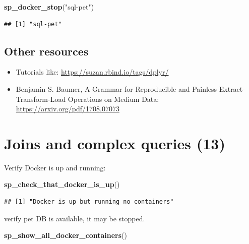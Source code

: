 \documentclass[]{book}
\newenvironment{Shaded}{\begin{snugshade}}{\end{snugshade}}
\newcommand{\KeywordTok}[1]{\textcolor[rgb]{0.13,0.29,0.53}{\textbf{#1}}}
\newcommand{\NormalTok}[1]{#1}
\newcommand{\StringTok}[1]{\textcolor[rgb]{0.31,0.60,0.02}{#1}}
\providecommand{\tightlist}{%
  \setlength{\itemsep}{0pt}\setlength{\parskip}{0pt}}
\theoremstyle{definition}
\theoremstyle{definition}
\theoremstyle{definition}
\theoremstyle{remark}
\begin{document}
\begin{Shaded}
\begin{Highlighting}[]
\KeywordTok{sp_docker_stop}\NormalTok{(}\StringTok{"sql-pet"}\NormalTok{)}
\end{Highlighting}
\end{Shaded}

\begin{verbatim}
## [1] "sql-pet"
\end{verbatim}

\hypertarget{other-resources}{%
\section{Other resources}\label{other-resources}}

\begin{itemize}
\tightlist
\item
  Tutorials like: \url{https://suzan.rbind.io/tags/dplyr/}
\item
  Benjamin S. Baumer, A Grammar for Reproducible and Painless
  Extract-Transform-Load Operations on Medium Data:
  \url{https://arxiv.org/pdf/1708.07073}
\end{itemize}

\hypertarget{joins-and-complex-queries-13}{%
\chapter{Joins and complex queries
(13)}\label{joins-and-complex-queries-13}}

Verify Docker is up and running:

\begin{Shaded}
\begin{Highlighting}[]
\KeywordTok{sp_check_that_docker_is_up}\NormalTok{()}
\end{Highlighting}
\end{Shaded}

\begin{verbatim}
## [1] "Docker is up but running no containers"
\end{verbatim}

verify pet DB is available, it may be stopped.

\begin{Shaded}
\begin{Highlighting}[]
\KeywordTok{sp_show_all_docker_containers}\NormalTok{()}
\end{Highlighting}
\end{Shaded}
\end{document}
